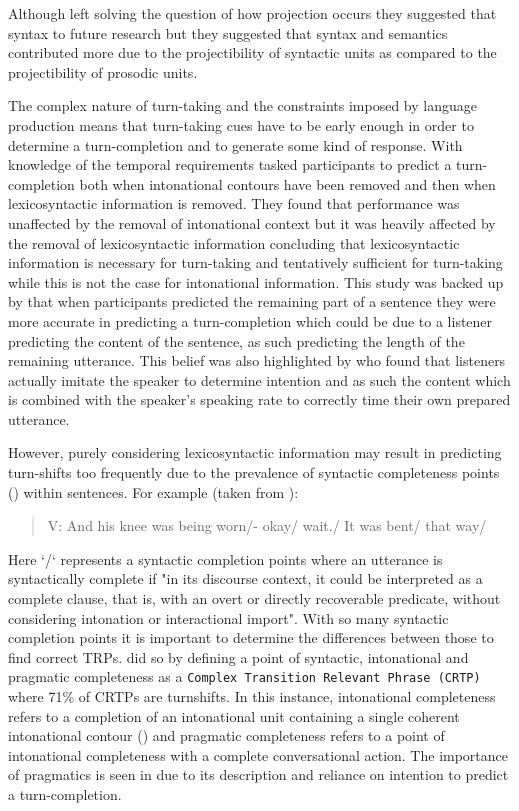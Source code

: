\documentclass[logo,bsc,singlespacing,parskip]{infthesis}
\begin{document}
Although \cite{Sacks1974} left solving the question of how projection occurs they suggested that syntax to future research but they suggested that syntax and semantics contributed more due to the projectibility of syntactic units as compared to the projectibility of prosodic units. 

The complex nature of turn-taking and the constraints imposed by language production means that turn-taking cues have to be early enough in order to determine a turn-completion and to generate some kind of response. With knowledge of the temporal requirements \cite{deRuiter2006} tasked participants to predict a turn-completion both when intonational contours have been removed and then when lexicosyntactic information is removed. They found that performance was unaffected by the removal of intonational context but it was heavily affected by the removal of lexicosyntactic information concluding that lexicosyntactic information is necessary for turn-taking and tentatively sufficient for turn-taking while this is not the case for intonational information. 
This study was backed up by \cite{Magyari2012} that when participants predicted the remaining part of a sentence they were more accurate in predicting a turn-completion which could be due to a listener predicting the content of the sentence, as such predicting the length of the remaining utterance. This belief was also highlighted by \cite{PicGar2013} who found that listeners actually imitate the speaker to determine intention and as such the content which is combined with the speaker's speaking rate to correctly time their own prepared utterance.

However, purely considering lexicosyntactic information may result in predicting turn-shifts too frequently due to the prevalence of syntactic completeness points (\cite{Ford1996}) within sentences. For example (taken from \cite{Ford1996}):

\begin{quote}
    V: And his knee was being worn/- okay/ wait./
    It was bent/ that way/
\end{quote}

Here `/` represents a syntactic completion points where an utterance is syntactically complete if "in its discourse context, it could be interpreted as a complete clause, that is, with an overt or directly recoverable predicate, without considering intonation or interactional import". With so many syntactic completion points it is important to determine the differences between those to find correct TRPs. \cite{Ford1996} did so by defining a point of syntactic, intonational and pragmatic completeness as a \texttt{Complex Transition Relevant Phrase (CRTP)} where 71\% of CRTPs are turnshifts. In this instance, intonational completeness refers to a completion of an intonational unit containing a single coherent intonational contour (\cite{DuBois1993}) and pragmatic completeness refers to a point of intonational completeness with a complete conversational action. The importance of pragmatics is seen in \cite{PicGar2013} due to its description and reliance on intention to predict a turn-completion. 
\end{document}
